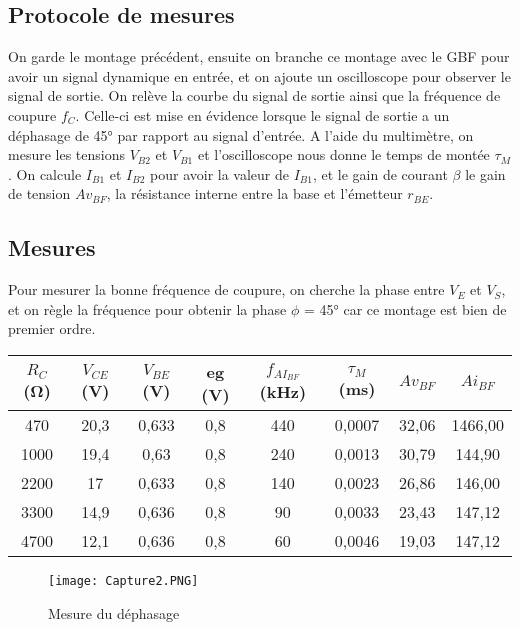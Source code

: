\documentclass{article}
\begin{document}
\subsection{Protocole de mesures}
On garde le montage précédent, ensuite on branche ce montage avec le GBF pour avoir un signal dynamique en entrée, et on ajoute un oscilloscope pour observer le signal de sortie.
On relève la courbe du signal de sortie ainsi que la fréquence de coupure $f_C$. Celle-ci est mise en évidence lorsque le signal de sortie a un déphasage de 45° par rapport au signal d’entrée.
A l’aide du multimètre, on mesure les tensions $V_{B2}$ et $V_{B1}$ et l’oscilloscope nous donne le temps de montée $\tau_M$.
On calcule $I_{B1}$ et $I_{B2}$ pour avoir la valeur de $I_{B1}$, et le gain de courant $\beta$ le gain de tension $Av_{BF}$, la résistance interne entre la base et l'émetteur $r_{BE}$.

\subsection{Mesures}
Pour mesurer la bonne fréquence de coupure, on cherche la phase entre $V_E$ et $V_S$, et on règle la fréquence pour obtenir la phase $\phi$ = 45° car ce montage est bien de premier ordre.

\begin{center}
    \begin{tabular}{||c | c | c | c | c | c | c | c||}
    \hline
    $R_C$ (Ω) & $V_{CE}$ (V) & $V_{BE}$ (V) & eg (V) & $f_{AI_{BF}}$ (kHz) & $\tau_M$ (ms) & $Av_{BF}$ & $Ai_{BF}$\\
    \hline
    \hline
    470  & 20,3 & 0,633 & 0,8 & 440 & 0,0007 & 32,06 & 1466,00\\
    \hline
    1000  & 19,4 & 0,63 & 0,8 & 240 & 0,0013 & 30,79 & 144,90\\
    \hline
    2200  & 17 & 0,633 & 0,8 & 140 & 0,0023 & 26,86 & 146,00\\
    \hline
    3300  & 14,9 & 0,636 & 0,8 & 90 & 0,0033 & 23,43 & 147,12\\
    \hline
    4700  & 12,1 & 0,636 & 0,8 & 60 & 0,0046 & 19,03 & 147,12\\
    \hline
    \end{tabular}
\end{center}

\begin{figure}[h!]
\centering
\texttt{[image: Capture2.PNG]}
\caption{Mesure du déphasage}
\label{fig:dephasage}
\end{figure}
\end{document}
